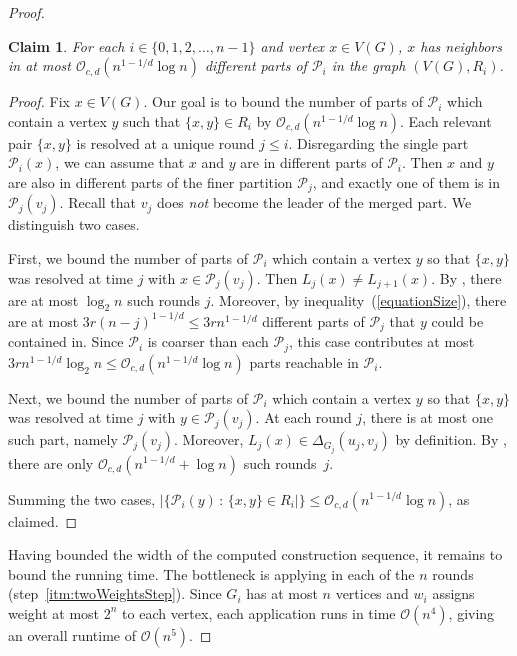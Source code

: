 \documentclass[11pt]{article}
\newtheorem{claim}[theorem]{Claim}
\theoremstyle{definition}
\newcommand{\PP}{{\mathcal P}}
\renewcommand{\leq}{\leqslant}
\renewcommand{\le}{\leqslant}
\newcommand{\set}[1]{\{#1\}}
\renewcommand{\cal}{\mathcal}
\newcommand{\Pp}{\mathcal{P}}
\begin{document}
\begin{proof}
    \begin{claim}\label{clm:bound-mw}
      For each $i \in \{0,1,2,\ldots, n-1\}$ and vertex $x\in V(G)$, $x$ has neighbors in at most $\mathcal{O}_{c,d}(n^{1-1/d}\log{n})$ different parts of $\PP_i$ in the graph $(V(G), R_i)$.
    \end{claim}

    \begin{proof}
      Fix $x\in V(G)$.
    Our goal is to bound the number of parts of $\Pp_i$ which contain a vertex \(y\) such that $\set{x,y}\in R_i$ by $\mathcal{O}_{c,d}(n^{1-1/d}\log{n})$.
    Each relevant pair $\set{x,y}$ is resolved at a unique round $j\le i$.
    Disregarding the single part $\PP_i(x)$, we can assume that $x$ and $y$ are in different parts of $\PP_i$.
    Then $x$ and $y$ are also in different parts of the finer partition $\Pp_j$, and exactly one of them is in~$\Pp_j(v_j)$.
    Recall that $v_j$ does \emph{not} become the leader of the merged part.
    We distinguish two cases.

    First, we bound the number of parts of $\Pp_i$ which contain a vertex $y$
    so that $\set{x,y}$ was resolved at time \(j\) with $x\in\Pp_j(v_j)$.
    Then $L_j(x) \neq L_{j+1}(x)$. By , there are
    at most $\log_2 n$ such rounds $j$. Moreover, by
    inequality~(\ref{equationSize}), there are at most $3r(n-j)^{1-1/d} \leq 3rn^{1-1/d}$ different
    parts of $\Pp_j$ that $y$ could be contained in. Since $\PP_i$ is coarser than each $\PP_j$, this case contributes at most $3rn^{1-1/d} \log_2{n} \leq \cal O_{c,d}(n^{1-1/d} \log{n})$ parts reachable in $\PP_i$.

    Next, we bound the number of parts of $\Pp_i$ which contain a vertex $y$
    so that $\set{x,y}$ was resolved at time \(j\) with $y\in\Pp_j(v_j)$.
    At each round $j$, there is at most one such part, namely $\Pp_j(v_j)$. Moreover, $L_j(x) \in
    \Delta_{G_j}(u_j, v_j)$ by definition. By , there are
    only $\cal O_{c,d}(n^{1-1/d} + \log{n})$ such rounds~$j$.
\newcommand{\setoff}[2]{\{#1\,:\,#2\}}

    Summing the two cases,
     $|\setoff{\Pp_i(y)}{\set{x,y}\in R_i|}\le \mathcal{O}_{c,d}(n^{1-1/d}\log{n})$, as claimed.
    \end{proof}
    

    Having bounded the width of the computed construction sequence, it remains to bound the running time. The bottleneck is applying
     in each of the $n$ rounds
    (step~\ref{itm:twoWeightsStep}). Since $G_i$ has at most $n$ vertices and $w_i$
    assigns weight at most $2^n$ to each vertex, each application runs in time
    $\mathcal{O}(n^4)$, giving an overall runtime of $\mathcal{O}(n^5)$.
\end{proof}
\end{document}
